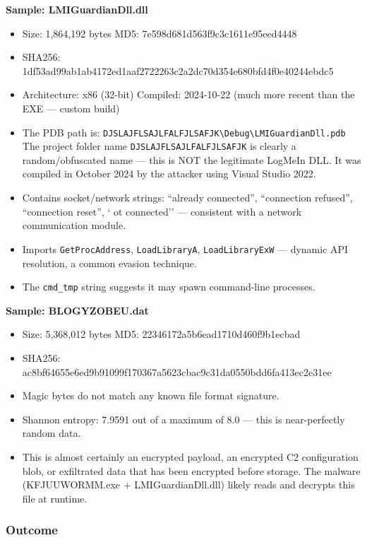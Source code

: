 \documentclass[
]{article}
\providecommand{\tightlist}{%
  \setlength{\itemsep}{0pt}\setlength{\parskip}{0pt}}
\begin{document}
\textbf{Sample: LMIGuardianDll.dll}

\begin{itemize}
\tightlist
\item
  Size: 1,864,192 bytes \textbar{} MD5: 7e598d681d563f9c3c1611e95eed4448
\item
  SHA256:
  1df53ad99ab1ab4172ed1aaf2722263c2a2dc70d354e680bfd4f0e40244ebdc5
\item
  Architecture: x86 (32-bit) \textbar{} Compiled: 2024-10-22 (much more
  recent than the EXE --- custom build)
\item
  The PDB path is:
  \texttt{DJSLAJFLSAJLFALFJLSAFJK\textbackslash{}Debug\textbackslash{}LMIGuardianDll.pdb}
  The project folder name \texttt{DJSLAJFLSAJLFALFJLSAFJK} is clearly a
  random/obfuscated name --- this is NOT the legitimate LogMeIn DLL. It
  was compiled in October 2024 by the attacker using Visual Studio 2022.
\item
  Contains socket/network strings: ``already connected'', ``connection
  refused'', ``connection reset'', `
ot connected'' --- consistent with
  a network communication module.
\item
  Imports \texttt{GetProcAddress}, \texttt{LoadLibraryA},
  \texttt{LoadLibraryExW} --- dynamic API resolution, a common evasion
  technique.
\item
  The \texttt{cmd\_tmp} string suggests it may spawn command-line
  processes.
\end{itemize}

\textbf{Sample: BLOGYZOBEU.dat}

\begin{itemize}
\tightlist
\item
  Size: 5,368,012 bytes \textbar{} MD5: 22346172a5b6ead1710d460f9b1ecbad
\item
  SHA256:
  ac8bf64655e6ed9b91099f170367a5623cbac9c31da0550bdd6fa413ec2e31ee
\item
  Magic bytes do not match any known file format signature.
\item
  Shannon entropy: 7.9591 out of a maximum of 8.0 --- this is
  near-perfectly random data.
\item
  This is almost certainly an encrypted payload, an encrypted C2
  configuration blob, or exfiltrated data that has been encrypted before
  storage. The malware (KFJUUWORMM.exe + LMIGuardianDll.dll) likely
  reads and decrypts this file at runtime.
\end{itemize}

\subsubsection{Outcome}\label{outcome}
\end{document}
